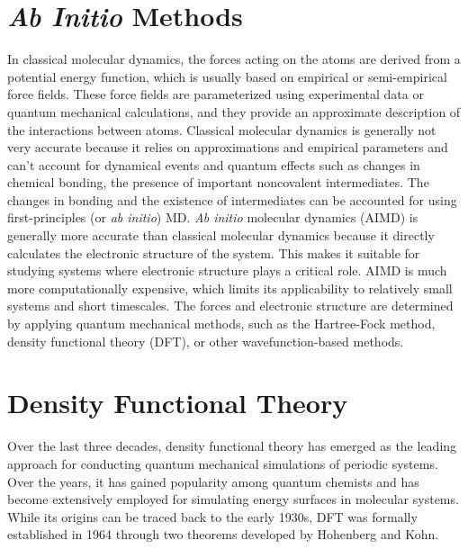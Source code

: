 \section{\textit{Ab Initio} Methods}
In classical molecular dynamics, the forces acting on the atoms are derived
from a potential energy function, which is usually based on empirical or
semi-empirical force fields. These force fields are parameterized using
experimental data or quantum mechanical calculations, and they provide an
approximate description of the interactions between atoms. Classical molecular
dynamics is generally not very accurate because it relies on approximations
and empirical parameters and can't account for dynamical events and quantum
effects such as changes in chemical bonding, the presence of important
noncovalent intermediates. The changes
in bonding and the existence of intermediates can be accounted for using
first-principles (or \textit{ab initio}) MD. \textit{Ab initio} molecular
dynamics (AIMD) is generally more accurate than classical molecular dynamics
because it directly calculates the electronic structure of the system. This
makes it suitable for studying systems where electronic structure plays a
critical role. AIMD is much more computationally expensive, which limits its
applicability to relatively small systems and short timescales. The forces and
electronic structure are determined by applying quantum mechanical methods,
such as the Hartree-Fock method, density functional theory (DFT), or other
wavefunction-based methods.

\section{Density Functional Theory}
Over the last three decades, density functional theory has emerged as the
leading approach for conducting quantum mechanical simulations of periodic
systems. Over the years, it has gained popularity among quantum chemists and
has become extensively employed for simulating energy surfaces in molecular
systems. While its origins can be traced back to the early 1930s, DFT was
formally established in 1964 through two theorems developed by Hohenberg and
Kohn.

